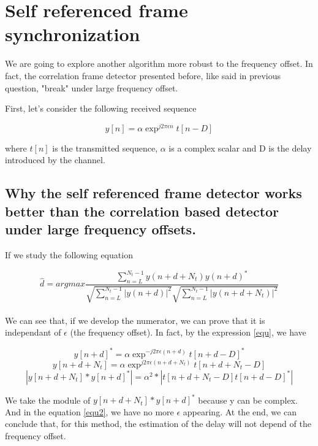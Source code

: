 \documentclass[frenchb, oneside, headings=normal]{scrartcl}
\begin{document}
\section{Self referenced frame synchronization}

We are going to explore another algorithm more robust to the frequency offset. In fact, the correlation frame detector presented before, like said in previous question, "break" under large frequency offset.

First, let's consider the following received sequence

\begin{equation}
y[n] = 	\alpha \exp^{j2\pi \epsilon n}t[n-D]
\label{equ} 
\end{equation}

where $t[n]$ is the transmitted sequence, $\alpha$ is a complex scalar and D is the delay 	introduced by the channel.

\subsection{Why the self referenced frame detector works better than the correlation based detector under large frequency offsets.}

If we study the following equation

\begin{equation}
\hat{d}=argmax \frac{\sum_{n=L}^{N_t-1} y(n+d+N_t)y(n+d)^*}{\sqrt{\sum_{n=L}^{N_t-1} |y(n+d)|^2}\sqrt{\sum_{n=L}^{N_t-1} |y(n+d+N_t)|^2}}
\end{equation}\\

We can see that, if we develop the numerator, we can prove that it is independant of $\epsilon$ (the frequency offset). In fact, by the expression \ref{equ}, we have

\begin{equation}
y[n+d]^*= \alpha \exp^{-j2\pi \epsilon (n+d)}t[n+d-D]^*
\end{equation}
\begin{equation}
y[n+d+N_t]= \alpha \exp^{j2\pi \epsilon (n+d+N_t)}t[n+d+N_t-D]
\end{equation}
\begin{equation}
|y[n+d+N_t]*y[n+d]^*| = \alpha^2*|t[n+d+N_t-D]t[n+d-D]^*|
\label{equ2}
\end{equation} 	

We take the module of $y[n+d+N_t]*y[n+d]^*$ because y can be complex. And in the equation \ref{equ2}, we have no more $\epsilon$ appearing.
At the end, we can conclude that, for this method, the estimation of the delay will not depend of the frequency offset. 
\end{document}
